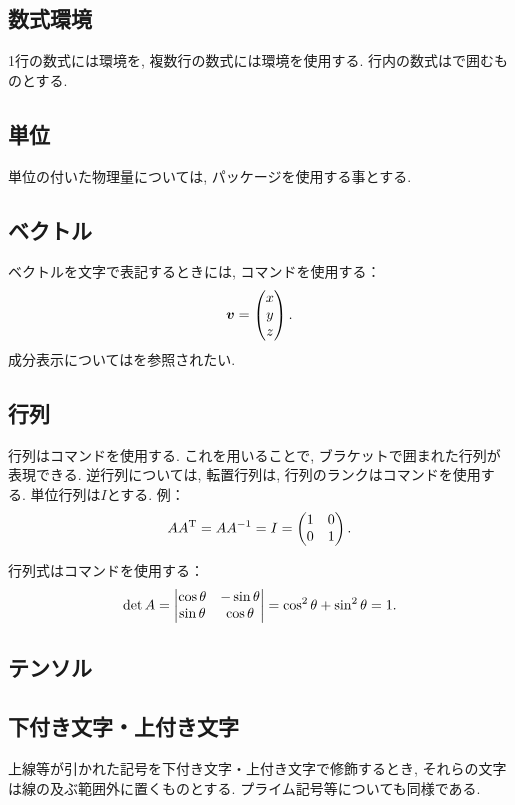 \documentclass[uplatex,a4j,twocolumn]{jsarticle}
\begin{document}
	\subsection{数式環境}
		1行の数式には環境を, 複数行の数式には環境を使用する. 行内の数式は\code{\$}で囲むものとする.
	\subsection{単位}
		単位の付いた物理量については, パッケージを使用する事とする.
	\subsection{ベクトル}
		ベクトルを文字で表記するときには, コマンドを使用する：
		\begin{equation}
			\bm{v} = \begin{pmatrix} x \\ y \\ z \end{pmatrix}.
		\end{equation}
		成分表示についてはを参照されたい.
	\subsection{行列}
		行列はコマンドを使用する. これを用いることで, ブラケットで囲まれた行列が表現できる. 逆行列については, 転置行列は, 行列のランクはコマンドを使用する. 単位行列は$I$とする. 例：
		\begin{equation}
			A A^{\mathrm{T}} = A A^{-1} = I = \begin{pmatrix} 1 & 0 \\ 0 & 1 \end{pmatrix}.
		\end{equation}
		
		行列式はコマンドを使用する：
		\begin{equation}
			\det{A} = \begin{vmatrix} \cos{\theta} & -\sin{\theta} \\ \sin{\theta} & \cos{\theta} \end{vmatrix} = \cos^2{\theta} + \sin^2{\theta} = 1.
		\end{equation}
	\subsection{テンソル}
	\subsection{下付き文字・上付き文字}
		上線等が引かれた記号を下付き文字・上付き文字で修飾するとき, それらの文字は線の及ぶ範囲外に置くものとする. プライム記号等についても同様である. 

\balance
\end{document}
